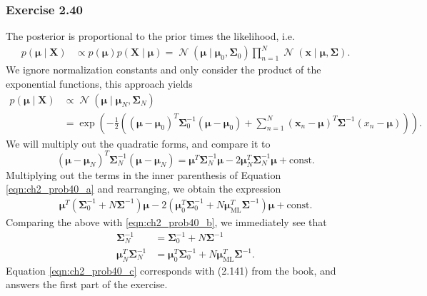 \documentclass[12pt, a4paper]{article}
\newcommand{\vect}[1]{\bm{#1}}
\DeclareMathOperator{\N}{\mathcal{N}}
\begin{document}
\subsubsection*{Exercise 2.40}
The posterior is proportional to the prior times the likelihood, i.e.
\begin{align*}
	p( \vect{\mu} \mid \vect{X} ) &\propto p(\vect{\mu}) p (\vect{X} \mid \vect{\mu}) 
	= \N \left( \vect{\mu} \mid \vect{\mu}_0, \vect{\Sigma}_0 \right)
	\prod_{n=1}^{N}
	\N \left( \vect{x} \mid \vect{\mu}, \vect{\Sigma} \right).
\end{align*}
We ignore normalization constants and only consider the product of the exponential functions, this approach yields
\begin{align}
	\nonumber p( \vect{\mu} \mid \vect{X} ) & \propto \N \left( \vect{\mu} \mid \vect{\mu}_N, \vect{\Sigma}_N \right) \\
	\label{eqn:ch2_prob40_a} &= \exp\left( - \frac{1}{2} \left( 
	(\vect{\mu} - \vect{\mu}_0)^T \vect{\Sigma}_0^{-1} (\vect{\mu} - \vect{\mu}_0)
	+
	\sum_{n=1}^{N} (\vect{x}_n - \vect{\mu})^T \vect{\Sigma}^{-1} (x_n - \vect{\mu})
	 \right) \right).
\end{align}
We will multiply out the quadratic forms, and compare it to
\begin{equation}
\label{eqn:ch2_prob40_b}
	(\vect{\mu} - \vect{\mu}_N)^T \vect{\Sigma}_N^{-1} (\vect{\mu} - \vect{\mu}_N)
	= \vect{\mu}^T \vect{\Sigma}_N^{-1} \vect{\mu} - 2 \vect{\mu}_N^T \vect{\Sigma}_N^{-1} \vect{\mu} + \text{const}.
\end{equation}
Multiplying out the terms in the inner parenthesis of Equation \eqref{eqn:ch2_prob40_a} and rearranging, we obtain the expression
\begin{align*}
	\vect{\mu}^T \left( \vect{\Sigma}_0^{-1} + N \vect{\Sigma}^{-1} \right) \vect{\mu} - 2 
	\left( \vect{\mu}_0^T \vect{\Sigma}_0^{-1} + N \vect{\mu}_{\text{ML}}^T  \vect{\Sigma}^{-1} \right) \vect{\mu} + \text{const}.
\end{align*}
Comparing the above with \eqref{eqn:ch2_prob40_b}, we immediately see that
\begin{align}
\label{eqn:ch2_prob40_c}
	\vect{\Sigma}_N^{-1} &= \vect{\Sigma}_0^{-1} + N \vect{\Sigma}^{-1} 
	\\
	\label{eqn:ch2_prob40_d}
	 \vect{\mu}_N^T \vect{\Sigma}_N^{-1} &=  \vect{\mu}_0^T \vect{\Sigma}_0^{-1} + N \vect{\mu}_{\text{ML}}^T  \vect{\Sigma}^{-1}.
\end{align}
Equation \eqref{eqn:ch2_prob40_c} corresponds with (2.141) from the book, and answers the first part of the exercise.
\end{document}
